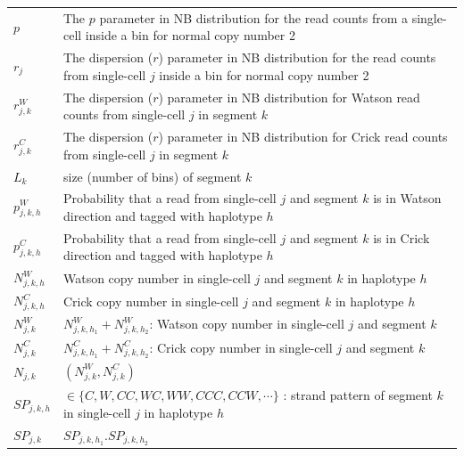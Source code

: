 \documentclass[12pt]{article}
\renewcommand{\j}{j} %
\renewcommand{\k}{k} %
\newcommand{\h}{h} %
\newcommand{\N}{N} %
\begin{document}
\begin{table}[tb]
\begin{tabular}{  p{4cm} p{12.5cm} }
		$p$ & The $p$ parameter in NB distribution for the read counts from a single-cell inside a bin for normal copy number 2\\
		
		$r_\j$ & The dispersion ($r$) parameter in NB distribution for the read counts from single-cell $\j$ inside a bin for normal copy number 2\\
		
		$r_{\j,\k}^W$ & The dispersion ($r$) parameter in NB distribution for Watson read counts from single-cell $\j$ in segment $\k$\\
		
		$r_{\j,\k}^C$ & The dispersion ($r$) parameter in NB distribution for Crick read counts from single-cell $\j$ in segment $\k$\\
		
		$L_\k$ & size (number of bins) of segment $\k$\\
		
        $p_{\j, \k, \h}^W$ & Probability that a read from single-cell $\j$ and segment $\k$ is in Watson direction and tagged with haplotype $\h$\\
		
		$p_{\j, \k, \h}^C$ & Probability that a read from single-cell $\j$ and segment $\k$ is in Crick direction and tagged with haplotype $\h$\\
		
		$\N_{\j, \k, \h}^W$ & Watson copy number in single-cell $\j$ and segment $\k$ in haplotype $\h$\\
		
		$\N_{\j, \k, \h}^C$ & Crick copy number in single-cell $\j$ and segment $\k$ in haplotype $\h$\\
		
		$\N_{\j,\k}^W$ & $\N_{\j, \k, \h_1}^W + \N_{\j, \k, \h_2}^W$: Watson copy number in single-cell $\j$ and segment $\k$\\
		
		$\N_{\j,\k}^C$ & $\N_{\j, \k, \h_1}^C + \N_{\j, \k, \h_2}^C$: Crick copy number in single-cell $\j$ and segment $\k$\\
		
		$\N_{\j, \k}$ & $(\N_{\j, \k}^W, \N_{\j, \k}^C)$\\
		
		$SP_{\j,\k, \h}$ & $\in \{C,W,CC,WC,WW,CCC,CCW, \cdots\}$ : strand pattern of segment $\k$ in single-cell $\j$ in haplotype $\h$\\
		
		$SP_{\j,\k}$ & $SP_{\j, \k, \h_1}.SP_{\j, \k, \h_2}$\\
		\hline
	\end{tabular}
	\label{notations}\vspace{-4.5mm}
\end{table}
\end{document}

